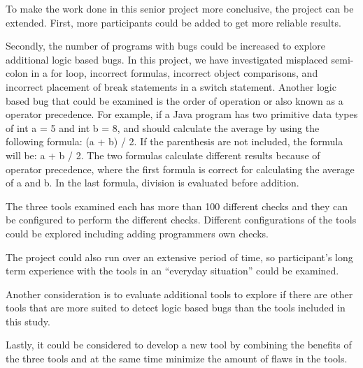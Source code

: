 To make the work done in this senior project more conclusive, the project can be extended. First, more participants could be added to get more reliable results. 

Secondly, the number of programs with bugs could be increased to explore additional logic based bugs. In this project, we have investigated misplaced semi-colon in a for loop, incorrect formulas, incorrect object comparisons, and incorrect placement of break statements in a switch statement. Another logic based bug that could be examined is the order of operation or also known as a operator precedence. For example, if a Java program has two primitive data types of int a = 5 and int b = 8, and should calculate the average by using the following formula: (a + b) / 2. If the parenthesis are not included, the formula will be: a + b / 2. The two formulas calculate different results because of operator precedence, where the first formula is correct for calculating the average of a and b. In the last formula, division is evaluated before addition. 

The three tools examined each has more than 100 different checks and they can be configured to perform the different checks. Different configurations of the tools could be explored including adding programmers own checks. 

The project could also run over an extensive period of time, so participant's long term experience with the tools in an “everyday situation” could be examined.

Another consideration is to evaluate additional tools to explore if there are other tools that are more suited to detect logic based bugs than the tools included in this study.

Lastly, it could be considered to develop a new tool by combining the benefits of the three tools and at the same time minimize the amount of flaws in the tools. 

